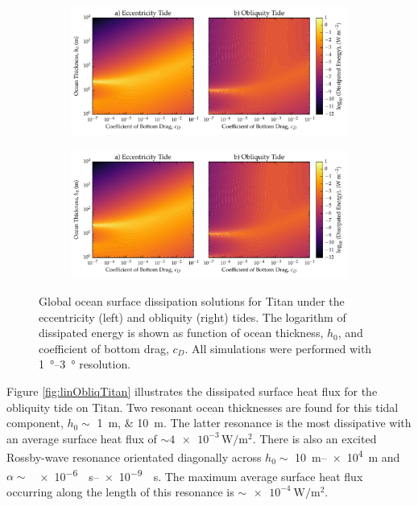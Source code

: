 \begin{figure}[!t]
    \centering
    \begin{subfigure}[t]{0.95\linewidth} %
        \includegraphics[width=\linewidth]{Figures/titan_bottom}
        \label{fig:botEccTitan}
    \end{subfigure}
    \begin{subfigure}[t]{0\linewidth} %
         \includegraphics[width=\linewidth]{Figures/titan_bottom}
         \label{fig:botObliqTitan}   
    \end{subfigure}
    \vspace{-0.5cm}
\caption{Global ocean surface dissipation solutions for Titan under the eccentricity (left) and obliquity (right) tides. The logarithm of dissipated energy is shown as function of ocean thickness, $h_0$, and coefficient of bottom drag, $c_D$. All simulations were performed with \SIrange{1}{3}{\degree} resolution. \label{fig:botTitan}}
\end{figure}


Figure \ref{fig:linObliqTitan} illustrates the dissipated surface heat flux for the obliquity tide on Titan. Two resonant ocean thicknesses are found for this tidal component, $h_0 \sim$ \SIlist{1;10}{\metre}. The latter resonance is the most dissipative with an average surface heat flux of $\sim \num{4e-3}\, \si{\watt\per\square\metre}$. There is also an excited Rossby-wave resonance orientated diagonally across $h_0 \sim$ \SIrange{10}{e4}{\metre} and \hbox{$\alpha \sim$ \SIrange{e-6}{e-9}{\per\second}}. The maximum average surface heat flux occurring along the length of this resonance is $\sim \SI{e-4}{\watt\per\square\metre}$. 

